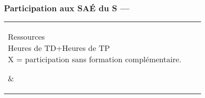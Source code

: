 \newpage
\subsubsection{Participation aux SAÉ du S — }
\begin{minipage}{\textwidth}
  \begin{center}
    \def\headertab#1{\multicolumn{2}{c|}{\rotatebox{90}{#1}}}
    \bigskip
    \begin{tabular}{l%
        cc%
      }
      \toprule
      \parbox[b]{5cm}{
        \begin{flushleft}
          Ressources\\
          Heures de TD+Heures de TP\\
          X = participation sans formation complémentaire.
        \end{flushleft}
      }
      &
      \\
      \cmidrule(lr){-}
      

\end{tabular}
\end{center}
\end{minipage}
